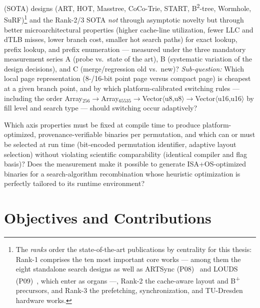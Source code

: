 \begin{description}
  (SOTA) designs (ART, HOT, Masstree, CoCo-Trie, START, B\textsuperscript{2}-tree, Wormhole,
  SuRF)\footnote{The \emph{ranks} order the state-of-the-art publications by centrality for this thesis: Rank-1 comprises the ten most important core works --- among them the eight standalone search designs as well as ARTSync (P08)~\cite{leis2016olc} and LOUDS (P09)~\cite{jacobson1989louds}, which enter as organs ---, Rank-2 the cache-aware layout and B\textsuperscript{+} precursors, and Rank-3 the prefetching, synchronization, and TU-Dresden hardware works.}
  and the Rank-2/3 SOTA \emph{not} through asymptotic novelty but through better microarchitectural
  properties (higher cache-line utilization, fewer LLC and dTLB misses, lower branch cost, smaller
  hot search paths) for exact lookup, prefix lookup, and prefix enumeration --- measured under the
  three mandatory measurement series A (probe vs.\ state of the art), B (systematic variation of the
  design decisions), and C (merge/regression old vs.\ new)? \emph{Sub-question:} Which local page
  representation (8-/16-bit point page versus compact page) is cheapest at a given branch point, and
  by which platform-calibrated switching rules --- including the order
  Array$_{256}\to$Array$_{65535}\to$Vector$\langle$u8,u8$\rangle\to$Vector$\langle$u16,u16$\rangle$
  by fill level and search type --- should switching occur adaptively?
  \item[RQ4 (Compile time vs.\ run time)] Which axis properties must be fixed at compile time to
  produce platform-optimized, provenance-verifiable binaries per permutation, and which can or must
  be selected at run time (bit-encoded permutation identifier, adaptive layout selection) without
  violating scientific comparability (identical compiler and flag basis)? Does the measurement make
  it possible to generate ISA+OS-optimized binaries for a search-algorithm recombination whose
  heuristic optimization is perfectly tailored to its runtime environment?
\end{description}

\section{Objectives and Contributions}\label{sec:contributions}

